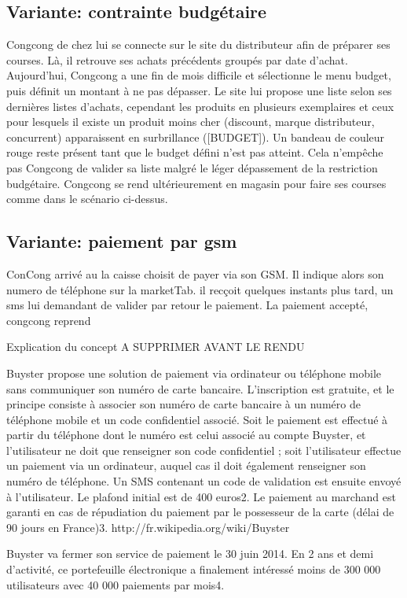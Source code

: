 \subsection{Variante: contrainte budgétaire}
Congcong de chez lui se connecte sur le site du distributeur afin de préparer ses courses.
Là, il retrouve ses achats précédents groupés par date d'achat.
Aujourd'hui, Congcong a une fin de mois difficile et sélectionne le menu budget, puis définit un montant à ne pas dépasser.
Le site lui propose une liste selon ses dernières listes d'achats, cependant les produits en plusieurs exemplaires et ceux pour lesquels il existe un produit moins cher (discount, marque distributeur, concurrent) apparaissent en surbrillance ([BUDGET]).
Un bandeau de couleur rouge reste présent tant que le budget défini n'est pas atteint.
Cela n'empêche pas Congcong de valider sa liste malgré le léger dépassement de la restriction budgétaire.
Congcong se rend ultérieurement en magasin pour faire ses courses comme dans le scénario ci-dessus.

\subsection{Variante: paiement par gsm}
ConCong arrivé au la caisse choisit de payer via son GSM. Il indique alors son numero de téléphone sur la marketTab. il recçoit quelques instants plus tard, un sms lui demandant de valider par retour le paiement.
La paiement accepté, congcong reprend \par

\TODO Explication du concept A SUPPRIMER AVANT LE RENDU\par
Buyster propose une solution de paiement via ordinateur ou téléphone mobile sans communiquer son numéro de carte bancaire. L'inscription est gratuite, et le principe consiste à associer son numéro de carte bancaire à un numéro de téléphone mobile et un code confidentiel associé. Soit le paiement est effectué à partir du téléphone dont le numéro est celui associé au compte Buyster, et l'utilisateur ne doit que renseigner son code confidentiel ; soit l'utilisateur effectue un paiement via un ordinateur, auquel cas il doit également renseigner son numéro de téléphone. Un SMS contenant un code de validation est ensuite envoyé à l'utilisateur. Le plafond initial est de 400 euros2. Le paiement au marchand est garanti en cas de répudiation du paiement par le possesseur de la carte (délai de 90 jours en France)3.
http://fr.wikipedia.org/wiki/Buyster\par

Buyster va fermer son service de paiement le 30 juin 2014. En 2 ans et demi d'activité, ce portefeuille électronique a finalement intéressé moins de 300 000 utilisateurs avec 40 000 paiements par mois4.
